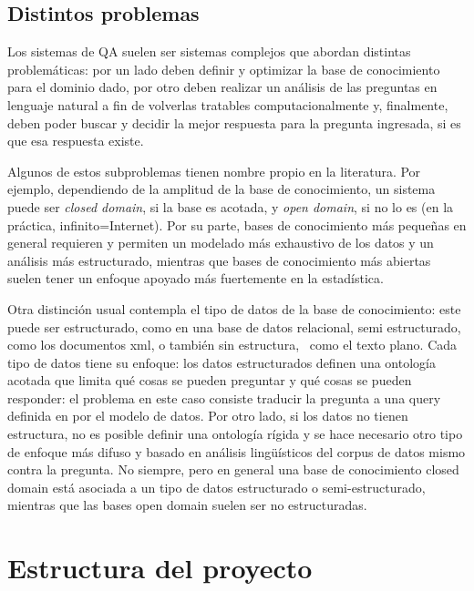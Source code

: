 \subsection{Distintos problemas}

Los sistemas de QA suelen ser sistemas complejos que abordan distintas
problem\'aticas: por un lado deben definir y optimizar la base de
conocimiento para el dominio dado, por otro deben realizar un
an\'alisis de las preguntas en lenguaje natural a fin de volverlas
tratables computacionalmente y, finalmente, deben poder buscar y
decidir la mejor respuesta para la pregunta ingresada, si es que esa
respuesta existe.


\bigskip

Algunos de estos subproblemas tienen nombre propio en la literatura. Por
ejemplo, dependiendo de la amplitud de la base de conocimiento, un
sistema puede ser \textit{closed domain}, si la base es acotada, y
\textit{open domain}, si no lo es (en la pr\'actica,
infinito=Internet). Por su parte, bases de conocimiento m\'as
peque\~nas en general requieren y permiten un modelado m\'as exhaustivo
de los datos y un an\'alisis m\'as estructurado, mientras que bases de conocimiento m\'as abiertas suelen
tener un enfoque apoyado m\'as fuertemente en la estad\'istica. 


\bigskip

Otra distinci\'on usual contempla el tipo de datos de la base de
conocimiento: este puede ser estructurado, como en una base de datos
relacional, semi estructurado, como los documentos xml, o tambi\'en sin
estructura, \ como el texto plano. Cada tipo de datos tiene su enfoque:
los datos estructurados definen una ontolog\'ia acotada que limita
qu\'e cosas se pueden preguntar y qu\'e cosas se pueden responder: el
problema en este caso consiste traducir la pregunta a una query
definida en por el modelo de datos. Por otro lado, si los datos no
tienen estructura, no es posible definir una ontolog\'ia r\'igida y se
hace necesario otro tipo de enfoque m\'as difuso y basado en an\'alisis
ling\"u\'isticos del corpus de datos mismo contra la pregunta. No siempre, 
pero en general una base de conocimiento closed domain est\'a asociada
a un tipo de datos estructurado o semi-estructurado, mientras que las bases open domain
suelen ser no estructuradas.



\section{Estructura del proyecto}

